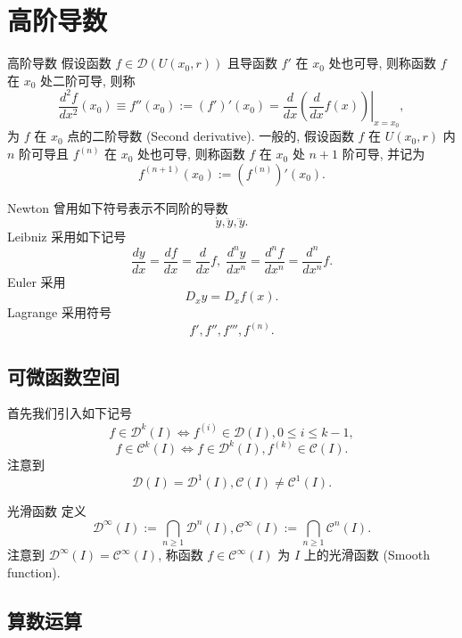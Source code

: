 \documentclass[cn,toc=twocol]{elegantbook}
\newcommand{\D}{\mathscr{D}}
\begin{document}
\section{高阶导数}

\begin{definition}{高阶导数}
	假设函数 $f \in \D(U(x_0,r))$ 且导函数 $f'$ 在 $x_0$ 处也可导, 则称函数 $f$ 在 $x_0$ 处二阶可导, 则称
	\[
		\frac{d^2 f}{dx^2}(x_0) \equiv f''(x_0) := (f')'(x_0) = \left. \frac{d}{dx}\left(\frac{d}{dx} f(x)\right) \right\vert_{x=x_0},
	\]
	为 $f$ 在 $x_0$ 点的二阶导数 (Second derivative). 一般的, 假设函数 $f$ 在 $U(x_0,r)$ 内 $n$ 阶可导且 $f^{(n)}$ 在 $x_0$ 处也可导, 则称函数 $f$ 在 $x_0$ 处 $n + 1$ 阶可导, 并记为
	\[
		f^{(n + 1)} (x_0) := (f^{(n)})'(x_0).
	\]
\end{definition}

Newton 曾用如下符号表示不同阶的导数
\[
	\dot{y}, \ddot{y}, \dddot{y}.
\]
Leibniz 采用如下记号
\[
	\frac{dy}{dx} = \frac{df}{dx} = \frac{d}{dx} f,\; \frac{d^n y}{dx^n} = \frac{d^n f}{dx^n} = \frac{d^n}{dx^n} f.
\]
Euler 采用
\[
	D_x y = D_x f(x).
\]
Lagrange 采用符号
\[
	f', f'', f''', f^{(n)}.
\]
\bigskip

\subsection{可微函数空间}


首先我们引入如下记号
\[
	f \in \D^k(I) \Longleftrightarrow f^{(i)} \in \D(I), 0 \le i \le k−1, 
\]
\[
	f \in \mathscr{C}^k(I) \Longleftrightarrow f \in \D^k(I), f^{(k)} \in \mathscr{C}(I).
\]
注意到
\[
	\D(I) = \D^1(I), \mathscr{C}(I) \neq \mathscr{C}^1(I).
\]

\begin{definition}{光滑函数}
	定义
	\[
		\D^{\infty}(I) := \bigcap_{n\ge 1}\D^n(I), \mathscr{C}^{\infty}(I) := \bigcap_{n \ge 1}\mathscr{C}^n(I).
	\]
	注意到 $\D^{\infty}(I) = \mathscr{C}^{\infty}(I)$, 称函数 $f \in \mathscr{C}^{\infty}(I)$ 为 $I$ 上的光滑函数 (Smooth function).
\end{definition}


\subsection{算数运算}
\end{document}

